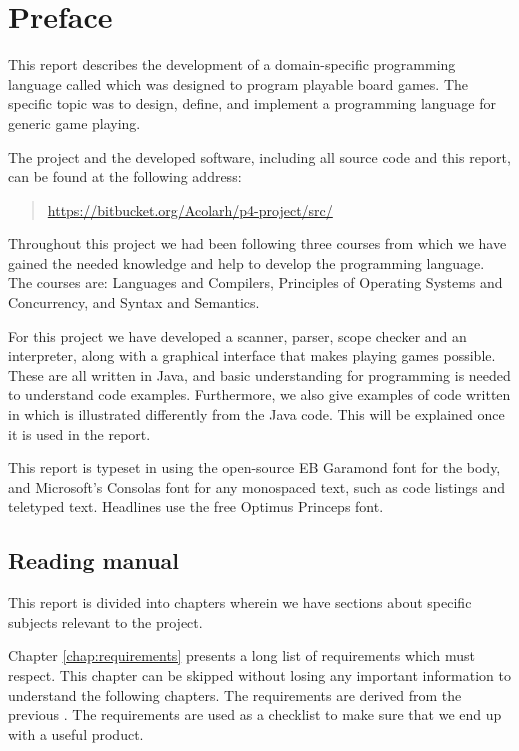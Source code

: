 \chapter*{Preface}
\label{chap:preface}

This report describes the development of a domain-specific programming
language called \productname{} which was designed to program playable board games. The 
specific topic was to design, define, and implement a programming language for 
generic game playing. 

The project and the developed software, including all source code and
this report, can be found at the following address:

\begin{quote}
  \url{https://bitbucket.org/Acolarh/p4-project/src/}  
\end{quote}

Throughout this project we had been following three courses from which we have
gained the needed knowledge and help to develop the programming language. The
courses are: Languages and Compilers, Principles of Operating Systems and
Concurrency, and Syntax and Semantics.

For this project we have developed a scanner, parser, scope checker and
an interpreter, along with a graphical interface that makes playing
games possible. These are all written in Java, and basic understanding
for programming is needed to understand code examples. Furthermore,
we also give examples of code written in \productname{} which is
illustrated differently from the Java code. This will be explained once
it is used in the report.

This report is typeset in \XeTeX{} using the open-source EB Garamond
font for the body, and Microsoft's Consolas font for any monospaced
text, such as code listings and teletyped text. Headlines use the free
Optimus Princeps font.

\section*{Reading manual}

This report is divided into chapters wherein we have sections about specific
subjects relevant to the project.

Chapter \ref{chap:requirements} presents a long list of requirements which
\productname{} must respect. This chapter can be skipped without losing any
important information to understand the following chapters. The requirements are 
derived from the previous . The requirements are used as
a checklist to make sure that we end up with a useful product.

